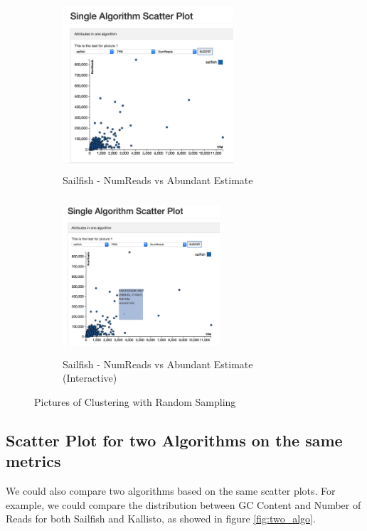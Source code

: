 \documentclass[11pt,letter]{article}
\begin{document}
\begin{figure}[h!]
        \centering
	\begin{subfigure}[h]{0.5\textwidth}
                \includegraphics[height=2.5in, width=2.5in]{fig/single_algo_sailfish.jpg}
		\caption{Sailfish - NumReads vs Abundant Estimate}
                \label{fig:single_algo_sailfish}
        \end{subfigure}%
        \begin{subfigure}[h]{0.5\textwidth}
                \includegraphics[height=2.3in, width=2.3in]{fig/interactive_single_algo_sailfish.jpg}
                \caption{Sailfish - NumReads vs Abundant Estimate (Interactive)}
                \label{fig:interactive_single_algo_sailfish}
        \end{subfigure}
        \caption{Pictures of Clustering with Random Sampling}\label{fig:cluster}
\end{figure}


\subsection {Scatter Plot for two Algorithms on the same metrics}
We could also compare two algorithms based on the same scatter plots. For example, we could compare the distribution between GC Content and Number of Reads for both Sailfish and Kallisto, as showed in figure \ref{fig:two_algo}.
\end{document}
